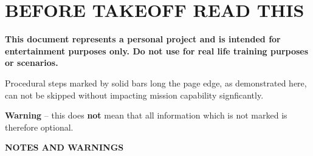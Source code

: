\tableofcontents
\etocsettocstyle{}{}%

\chapter*{BEFORE TAKEOFF READ THIS}
\thumbnar

\begin{tcolorbox}[
    enhanced, 
    colback=white, 
    colframe=color1, 
    colbacktitle=white, 
    coltitle=color1, 
    sharp corners, 
    attach boxed title to top center={yshift=2mm},
    boxed title style={
        sharp corners,
        drop shadow=color1!100
    }, 
    title=\LARGE\textbf{DISCLAIMER}
]
    \textbf{%
        This document represents a personal project
        and is intended for entertainment purposes only.
        Do not use for real life training purposes or scenarios.
    }
\end{tcolorbox}

\bigskip

\begin{multicols}{2}
    
    \medskip

    Procedural steps marked by solid bars long the page edge,
    as demonstrated here, 
    can not be skipped without impacting mission capability signficantly.

    \medskip 

    \textbf{Warning} -- this does \textbf{not} mean that all information which is not marked is therefore optional.
    \cbend 

    \vfill\null
    \columnbreak

    {\Large\textbf{NOTES AND WARNINGS}}


\end{multicols}

\cleardoublepage